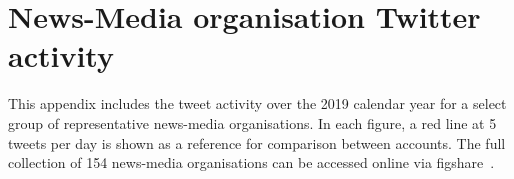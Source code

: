\chapter{News-Media organisation Twitter activity \label{app:activity}}

This appendix includes the tweet activity over the 2019 calendar year for a select group of representative news-media organisations. In each figure, a red line at 5 tweets per day is shown as a reference for comparison between accounts. The full collection of 154 news-media organisations can be accessed online via figshare~\cite{figshareSouth2021}.
\captionsetup[figure]{list=no,hypcap=false}















